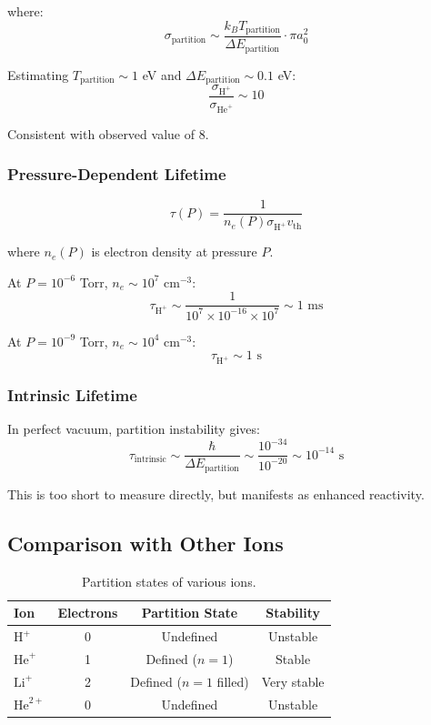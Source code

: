 \documentclass[12pt,a4paper]{article}
\begin{document}
where:
$$
\sigma_{\text{partition}} \sim \frac{k_B T_{\text{partition}}}{\Delta E_{\text{partition}}} \cdot \pi a_0^2
$$

Estimating $T_{\text{partition}} \sim 1$ eV and $\Delta E_{\text{partition}} \sim 0.1$ eV:
$$
\frac{\sigma_{\text{H}^+}}{\sigma_{\text{He}^+}} \sim 10
$$

Consistent with observed value of 8.

\subsubsection{Pressure-Dependent Lifetime}

$$
\tau(P) = \frac{1}{n_e(P) \sigma_{\text{H}^+} v_{\text{th}}}
$$

where $n_e(P)$ is electron density at pressure $P$.

At $P = 10^{-6}$ Torr, $n_e \sim 10^7$ cm$^{-3}$:
$$
\tau_{\text{H}^+} \sim \frac{1}{10^7 \times 10^{-16} \times 10^7} \sim 1 \text{ ms}
$$

At $P = 10^{-9}$ Torr, $n_e \sim 10^4$ cm$^{-3}$:
$$
\tau_{\text{H}^+} \sim 1 \text{ s}
$$

\subsubsection{Intrinsic Lifetime}

In perfect vacuum, partition instability gives:
$$
\tau_{\text{intrinsic}} \sim \frac{\hbar}{\Delta E_{\text{partition}}} \sim \frac{10^{-34}}{10^{-20}} \sim 10^{-14} \text{ s}
$$

This is too short to measure directly, but manifests as enhanced reactivity.

\subsection{Comparison with Other Ions}

\begin{table}[h]
\centering
\begin{tabular}{lccc}
\toprule
Ion & Electrons & Partition State & Stability \\
\midrule
$\text{H}^+$ & 0 & Undefined & Unstable \\
$\text{He}^+$ & 1 & Defined ($n=1$) & Stable \\
$\text{Li}^+$ & 2 & Defined ($n=1$ filled) & Very stable \\
$\text{He}^{2+}$ & 0 & Undefined & Unstable \\
\bottomrule
\end{tabular}
\caption{Partition states of various ions.}
\label{tab:partitionstates}
\end{table}
\end{document}
